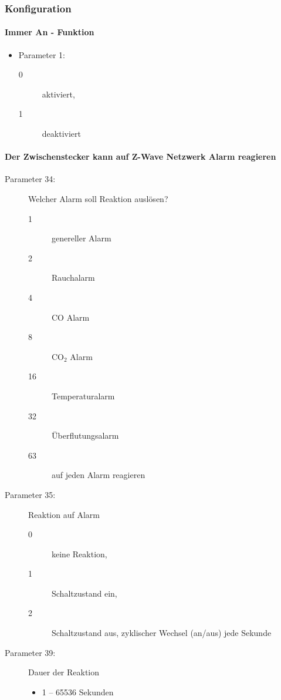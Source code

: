 \subsubsection{Konfiguration}

\paragraph{Immer An - Funktion}
\begin{itemize}
	\item Parameter 1:
	\begin{description}
		\item [0] aktiviert,
		\item [1] deaktiviert
	\end{description}
\end{itemize}

\paragraph{Der Zwischenstecker kann auf Z-Wave Netzwerk Alarm reagieren}
\begin{description}
	\item [Parameter 34:] Welcher Alarm soll Reaktion auslösen?
	\begin{description}
		\item [1] genereller Alarm
		\item [2] Rauchalarm
		\item [4] CO Alarm
		\item [8] CO$_2$ Alarm
		\item [16] Temperaturalarm
		\item [32] Überflutungsalarm
		\item [63] auf jeden Alarm reagieren
	\end{description}
	\item [Parameter 35:] Reaktion auf Alarm
	\begin{description}
		\item [0] keine Reaktion,
		\item [1] Schaltzustand ein,
		\item [2] Schaltzustand aus, zyklischer Wechsel (an/aus) jede Sekunde	
	\end{description}
	\item [Parameter 39:] Dauer der Reaktion
	\begin{itemize}
		\item 1 – 65536 Sekunden
	\end{itemize}
\end{description}


